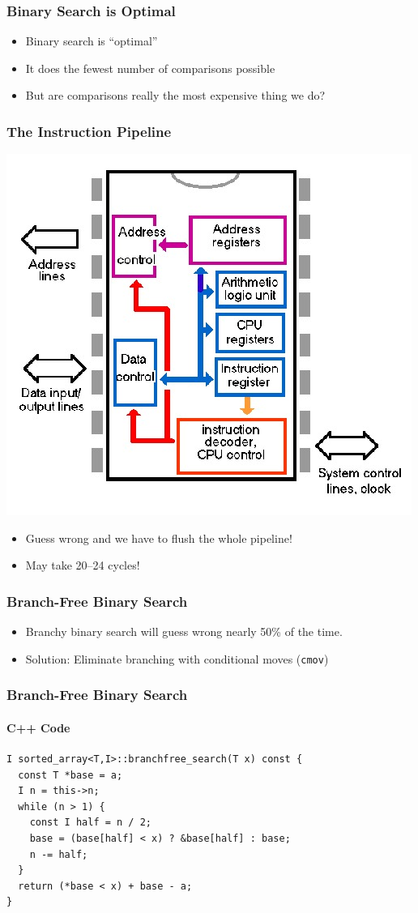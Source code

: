\documentclass[xcolor=dvipsnames]{beamer}
\begin{document}
\begin{frame}
   \frametitle{Binary Search is Optimal}

   \begin{itemize}
     \item Binary search is ``optimal''
     \item It does the fewest number of comparisons possible
     \item But are comparisons really the most expensive thing we do?
   \end{itemize}
\end{frame}

\begin{frame}
   \frametitle{The Instruction Pipeline}

   \begin{center}
      \includegraphics[width=.3\textwidth]{images/micro3c}
   \end{center}
   \vspace{-1em}
   \begin{itemize}
     \item<4->Guess wrong and we have to flush the whole pipeline!
     \item<5->May take 20--24 cycles!
   \end{itemize}
\end{frame}


\begin{frame}
   \frametitle{Branch-Free Binary Search}

   \begin{itemize}
       \item Branchy binary search will guess 
                wrong nearly 50\% of the time.
       \item Solution: Eliminate branching with conditional moves (\texttt{\color{blue}cmov})
   \end{itemize}
\end{frame}


\begin{frame}[fragile]
   \frametitle{Branch-Free Binary Search}
   \framesubtitle{C++ Code}
\begin{verbatim}
I sorted_array<T,I>::branchfree_search(T x) const {
  const T *base = a;
  I n = this->n;
  while (n > 1) {
    const I half = n / 2;
    base = (base[half] < x) ? &base[half] : base;
    n -= half;
  }
  return (*base < x) + base - a;
}
\end{verbatim}
\end{frame}
\end{document}
